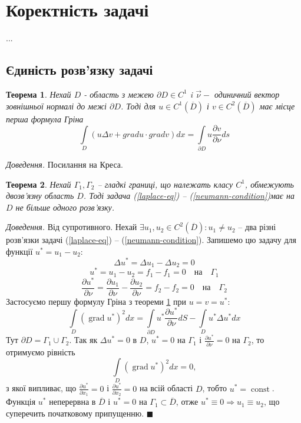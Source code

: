 \documentclass[14pt,a4paper]{extarticle}
\newcounter{e}
\newtheorem{theorem}{Теорема}[section]
\newcommand{\proof}{\textit{Доведення. \space}}
\numberwithin{equation}{section}
\newcommand{\intl}{\int\limits}
\begin{document}
\newcommand{\boundprob}{(\ref{laplace-eq}) -- (\ref{neumann-condition})} 
	
	
 \newpage
 \thispagestyle{empty}
 \section{Коректність задачі}
 ...
 
 \subsection{Єдиність розв'язку задачі}
 \begin{theorem}
 \label{green}
 Нехай $D$ - область з межею $\partial D \in C^1$ i $\overrightarrow{\nu} -$ одиничний вектор зовнішньої нормалі до межі $\partial D$. Тоді для $u \in C^1(\overline{D})$ і $v \in C^2(\overline{D})$ має місце перша формула Гріна
 $$
 \intl_{D}(u \Delta v+grad u \cdot grad v) d x=\intl_{\partial D} u \frac{\partial v}{\partial \nu} d s
 $$
\end{theorem}
 
\proof Посилання на Креса.
  
\begin{theorem}
	\label{single-sol}
	Нехай $\Gamma_{1}, \Gamma_{2}$ -- гладкі границі, що належать класу $C^1$, обмежують двозв'язну область $D$. Тоді задача \boundprob \space має на $D$ не більше одного розв'язку.
\end{theorem}
 
 \proof Від супротивного. Нехай $\exists u_1, u_2 \in C^{2}(\overline{D}): u_1 \neq u_2 $ -- два різні розв'язки задачі \boundprob. Запишемо цю задачу для функції $u^* = u_1 - u_2$:
 $$
 \Delta u^* = \Delta u_1 - \Delta u_2 = 0
 $$
 $$
 u^* = u_1 - u_2 = f_1 - f_1 = 0 \quad \text{на} \quad \Gamma_1
 $$
 $$
 \frac{\partial u^*}{\partial \nu}
 = \frac{\partial u_1}{\partial \nu} - \frac{\partial u_2}{\partial \nu}
 = f_2 - f_2 = 0 \quad \text{на} \quad \Gamma_2
 $$
 Застосуємо першу формулу Гріна з теореми \ref{green} при $u = v = u^*$:
 $$
 \intl_{D}(\operatorname{grad} u^*)^2 dx
 = \intl_{\partial D} u^* \frac{\partial u^*}{\partial \nu} dS
 - \intl_{D} u^* \Delta u^* dx
 $$
 Тут $\partial D = \Gamma_1 \cup \Gamma_2$. Так як $\Delta u^* = 0 $ в $D$, $u^*=0$ на $\Gamma_1$ і $\frac{\partial u^*}{\partial \nu} = 0$ на $\Gamma_2$, то отримуємо рівність
 $$
 \intl_{D}(\operatorname{grad} u^*)^2 dx = 0,
 $$
 з якої випливає, що $\frac{\partial u^*}{\partial x_1} = 0$ і $\frac{\partial u^*}{\partial x_2} = 0$ на всій області $D$, тобто $u^* = \operatorname{const}$. Функція $u^*$ неперервна в $\overline{D}$ і $u^*=0$ на $\Gamma_1 \subset \overline{D}$, отже $u^*\equiv0 \Rightarrow u_1\equiv u_2$, що суперечить початковому припущенню. $\blacksquare$
 
\end{document}
